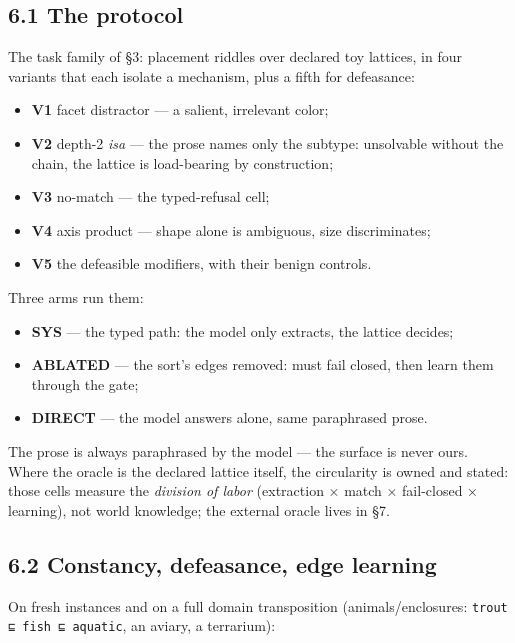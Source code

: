 \documentclass[11pt]{article}
\begin{document}
\subsection*{6.1 The protocol}

The task family of §3: placement riddles over declared toy lattices, in four variants that each isolate a mechanism, plus a fifth for defeasance:

\begin{itemize}
\item \textbf{V1} facet distractor — a salient, irrelevant color;
\item \textbf{V2} depth-2 \emph{isa} — the prose names only the subtype: unsolvable without the chain, the lattice is load-bearing by construction;
\item \textbf{V3} no-match — the typed-refusal cell;
\item \textbf{V4} axis product — shape alone is ambiguous, size discriminates;
\item \textbf{V5} the defeasible modifiers, with their benign controls.
\end{itemize}

Three arms run them:

\begin{itemize}
\item \textbf{SYS} — the typed path: the model only extracts, the lattice decides;
\item \textbf{ABLATED} — the sort's edges removed: must fail closed, then learn them through the gate;
\item \textbf{DIRECT} — the model answers alone, same paraphrased prose.
\end{itemize}

The prose is always paraphrased by the model — the surface is never ours. Where the oracle is the declared lattice itself, the circularity is owned and stated: those cells measure the \emph{division of labor} (extraction × match × fail-closed × learning), not world knowledge; the external oracle lives in §7.

\subsection*{6.2 Constancy, defeasance, edge learning}

On fresh instances and on a full domain transposition (animals/enclosures: \texttt{trout ⊑ fish ⊑ aquatic}, an aviary, a terrarium):
\end{document}
